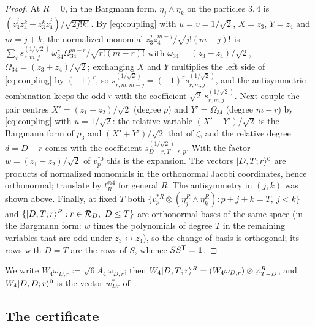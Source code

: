 \begin{proof}
At $R=0$, in the Bargmann form, $\eta_j\wedge\eta_k$ on the particles $3,4$ is $(z_3^jz_4^k-z_3^kz_4^j)/\sqrt{2j!k!}$. By
\eqref{eq:coupling} with $u=v=1/\sqrt2$, $X=z_3$, $Y=z_4$ and $m=j+k$, the normalized monomial $z_3^jz_4^{m-j}/\sqrt{j!(m-j)!}$ is
$\sum_rs^{(1/\sqrt2)}_{r,m,j}\,\omega_{34}^r\Omega_{34}^{m-r}/\sqrt{r!(m-r)!}$ with $\omega_{34}=(z_3-z_4)/\sqrt2$, $\Omega_{34}=(z_3+z_4)/\sqrt2$;
exchanging $X$ and $Y$ multiplies the left side of \eqref{eq:coupling} by $(-1)^r$, so $s^{(1/\sqrt2)}_{r,m,m-j}=(-1)^rs^{(1/\sqrt2)}_{r,m,j}$,
and the antisymmetric combination keeps the odd $r$ with the coefficient $\sqrt2\,s^{(1/\sqrt2)}_{r,m,j}$. Next couple the pair
centres $X'=(z_1+z_2)/\sqrt2$ (degree $p$) and $Y'=\Omega_{34}$ (degree $m-r$) by \eqref{eq:coupling} with $u=1/\sqrt2$: the
relative variable $(X'-Y')/\sqrt2$ is the Bargmann form of $\rho_3$ and $(X'+Y')/\sqrt2$ that of $\zeta$, and the relative degree
$d=D-r$ comes with the coefficient $s^{(1/\sqrt2)}_{D-r,T-r,p}$. With the factor $w=(z_1-z_2)/\sqrt2$ of $v_p^{*0}$ this is the
expansion. The vectors $\lvert D,T;r\rangle^0$ are products of normalized monomials in the orthonormal Jacobi coordinates, hence
orthonormal; translate by $t_R^{\otimes4}$ for general $R$. The antisymmetry in $(j,k)$ was shown above. Finally, at fixed $T$
both $\{v_p^{*R}\otimes(\eta_j^R\wedge\eta_k^R):p+j+k=T,\ j<k\}$ and $\{\lvert D,T;r\rangle^R:r\in\mathcal R_D,\ D\le T\}$ are orthonormal bases of the
same space (in the Bargmann form: $w$ times the polynomials of degree $T$ in the remaining variables that are odd under
$z_3\leftrightarrow z_4$), so the change of basis is orthogonal; its rows with $D=T$ are the rows of $S$, whence $SS^{\mathsf T}=\mathbf{1}$.
\end{proof}

We write $W_4\omega_{D,r}:=\sqrt6A_4\,\omega_{D,r}$; then $W_4\lvert D,T;r\rangle^R=(W_4\omega_{D,r})\otimes\varphi^R_{T-D}$, and
$W_4\lvert D,D;r\rangle^0$ is the vector $w^*_{Dr}$ of~\cite[Section~4.2, (27)]{OAI:A-Fock-space-inequality-and-the-Laughlin-spectral-gap-September-24-2026}.

\subsection{The certificate}

